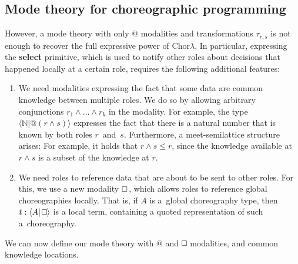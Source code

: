 \documentclass{scrartcl}
\renewcommand{\square}{\mathop{\mathchoice%
  {\tikz{\draw (0,0) rectangle (0.2cm,0.2cm);}}%
  {\tikz{\draw (0,0) rectangle (0.2cm,0.2cm);}}%
  {\tikz{\draw (0,0) rectangle (0.15cm,0.15cm);}}%
  {\tikz{\draw (0,0) rectangle (0.10cm,0.10cm);}}}}
\theoremstyle{definition}
\theoremstyle{plain}
\newcommand{\primitive}[1]{\textsf{\textbf{#1}}}
\begin{document}
\subsection{Mode theory for choreographic programming}
However, a mode theory with only $@$ modalities and transformations
$\tau_{r,s}$ is not enough to recover the full expressive power of
Chor$\lambda$. In particular, expressing the \primitive{select} primitive,
which is used to notify other roles about decisions that happened locally at
a certain role, requires the following additional features:
\begin{enumerate}
\item
  We need modalities expressing the fact that some data are common knowledge
  between multiple roles. We do so by allowing arbitrary conjunctions $r_1
  \land \ldots \land r_k$ in the modality. For example, the type $\langle
  \mathbb{N} | @(r\land s) \rangle$ expresses the fact that there is a natural
  number that is known by both roles $r$~and~$s$. Furthermore, a
  meet-semilattice structure arises: For example, it holds that $r \land s \leq
  r$, since the knowledge available at $r \land s$ is a subset of the knowledge
  at $r$.
\item
  We need roles to reference data that are about to be sent to other roles. For
  this, we use a new modality $\square\,$, which allows roles to reference
  global choreographies locally. That is, if $A$ is a~global choreography type,
  then $t : \langle A | \square \rangle$ is a local term, containing a quoted
  representation of such a~choreography.
\end{enumerate}
We can now define our mode theory with $@$ and $\square$ modalities, and common
knowledge locations.
\end{document}
